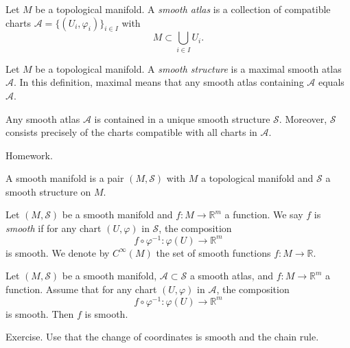 \documentclass{ximera}
\begin{document}
    
    \begin{definition}
        Let $M$ be a  topological manifold. A \emph{smooth atlas} is a collection of compatible charts $\mathcal{A} = \{  (U_i , \varphi_i ) \} _{i \in I } $  with 
        \[       M \subset \bigcup _{i \in I} U_i .                \]
    \end{definition}

    \begin{definition}
        Let $M$ be a  topological manifold. A \emph{smooth structure} is a maximal smooth atlas $\mathcal{A}$. In this definition, maximal means that any smooth atlas containing $\mathcal{A}$ equals $\mathcal{A}$. 
    \end{definition}
    
    \begin{proposition}
        Any smooth atlas $\mathcal{A}$ is contained in a unique smooth structure $\mathcal{S}$. Moreover, $\mathcal{S}$ consists precisely of the charts compatible with all charts in $\mathcal{A}$.
        

    \begin{solution}
        Homework.
    \end{solution}
    \end{proposition}


    \begin{definition}
        A smooth manifold is a pair $(M, \mathcal{S})$ with  $M$ a topological manifold and  $\mathcal{S}$ a smooth structure on $M$.
    \end{definition}

    
    \begin{definition}
    Let $(M, \mathcal{S})$ be a smooth manifold and $f : M \to \mathbb{R}^m$ a function. We say $f$ is \emph{smooth} if for any chart $(U , \varphi)$ in $ \mathcal{S}$, the composition
    \[     f \circ \varphi ^{-1} : \varphi (U ) \to \mathbb{R}^m        \]
    is smooth. We denote by $C^{\infty}(M)$ the set of smooth functions $f : M \to \mathbb{R}$. 
    \end{definition}

    \begin{proposition} 
    Let $(M, \mathcal{S})$ be a smooth manifold, $\mathcal{A} \subset \mathcal{S}$ a smooth atlas, and  $f : M \to \mathbb{R}^m$ a function. Assume that for any chart $(U, \varphi)$ in $\mathcal{A}$, the composition 
    \[     f \circ \varphi ^{-1} : \varphi (U ) \to \mathbb{R}^m        \]
    is smooth.  Then $f$ is smooth.  
    

    \begin{solution}
    Exercise. Use that the change of coordinates is smooth and the chain rule.         
    \end{solution}   
    \end{proposition}
\end{document}
